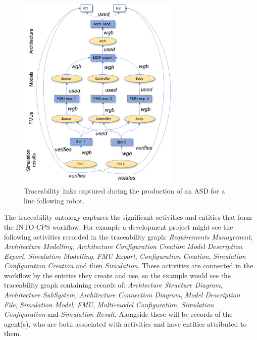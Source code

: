 

\begin{figure}[htbp]
	\centering
	\includegraphics[width=0.7\textwidth]{figures/Traceability/abstractTraceFlow}
\caption{Traceability links captured during the production of an ASD for a line following robot.}\label{fig:traceability:abstractTraceFlow}
\end{figure}



The traceability ontology captures the significant activities and entities that form the INTO-CPS workflow.  For example a development project might see the following activities recorded in the traceability graph:  \emph{Requirements Management}, \emph{Architecture Modelling}, \emph{Architecture Configuration Creation} \emph{Model Description Export}, \emph{Simulation Modelling}, \emph{FMU Export}, \emph{Configuration Creation}, \emph{Simulation Configuration Creation} and then \emph{Simulation}.  These activities are connected in the workflow by the entities they create and use, so the example would see the traceability graph containing records of: \emph{Archtecture Structure Diagram}, \emph{Architecture SubSystem}, \emph{Architecture Connection Diagram}, \emph{Model Description File}, \emph{Simulation Model}, \emph{FMU}, \emph{Multi-model Configuration}, \emph{Simulation Configuration} and \emph{Simulation Result}.  Alongside these will be records of the agent(s), who are both associated with activities and have entities attributed to them. 




